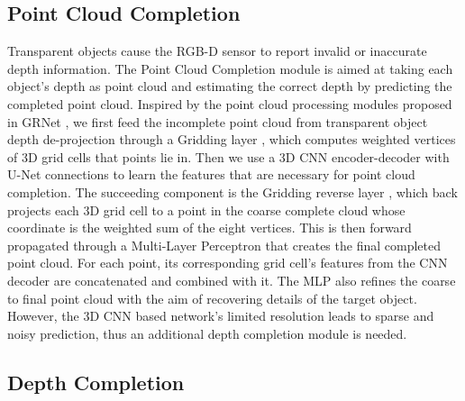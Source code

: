 \documentclass{article}
\begin{document}
\subsection{Point Cloud Completion}
Transparent objects cause the RGB-D sensor to report invalid or inaccurate depth information. The Point Cloud Completion module is aimed at taking each object's depth as point cloud and estimating the correct depth by predicting the completed point cloud. Inspired by the point cloud processing modules proposed in GRNet \citep{GRNet}, we first feed the incomplete point cloud from transparent object depth de-projection through a Gridding layer \citep{GRNet}, which computes weighted vertices of 3D grid cells that points lie in. Then we use a 3D CNN encoder-decoder with U-Net connections \citep{ronneberger2015unet} to learn the features that are necessary for point cloud completion. The succeeding component is the Gridding reverse layer \citep{GRNet}, which back projects each 3D grid cell to a point in the coarse complete cloud whose coordinate is the weighted sum of the eight vertices. This is then forward propagated through a Multi-Layer Perceptron that creates the final completed point cloud. For each point, its corresponding grid cell's features from the CNN decoder are concatenated and combined with it. The MLP also refines the coarse to final point cloud with the aim of recovering details of the target object. However, the 3D CNN based network's limited resolution leads to sparse and noisy prediction, thus an additional depth completion module is needed. 


 

\subsection{Depth Completion}
\end{document}
